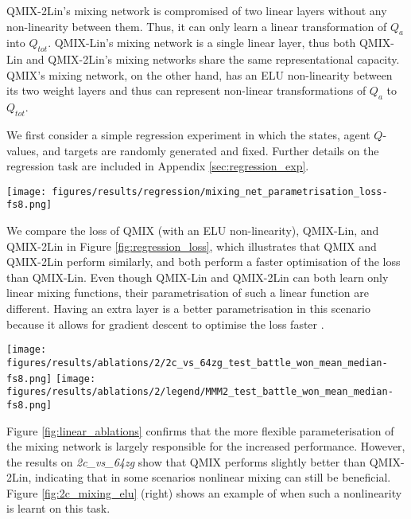 \documentclass[twoside,11pt]{article}
\begin{document}
QMIX-2Lin's mixing network is compromised of two linear layers without any non-linearity between them. Thus, it can only learn a linear transformation of $Q_a$ into $Q_{tot}$. 
QMIX-Lin's mixing network is a single linear layer, thus both QMIX-Lin and QMIX-2Lin's mixing networks share the same representational capacity.
QMIX's mixing network, on the other hand, has an ELU non-linearity between its 
two weight layers and thus can represent non-linear transformations of $Q_a$ to 
$Q_{tot}$. 

We first consider a simple regression experiment in which the states, agent $Q$-values, and targets are randomly generated and fixed. 
Further details on the regression task are included in Appendix \ref{sec:regression_exp}.

\begin{figure*}[h!]
    \centering
    \texttt{[image: figures/results/regression/mixing\_net\_parametrisation\_loss-fs8.png]}
    \caption{The loss on a regression task.}
    \label{fig:regression_loss}
\end{figure*}

We compare the loss of QMIX (with an ELU non-linearity), QMIX-Lin, and QMIX-2Lin in Figure \ref{fig:regression_loss}, which illustrates that QMIX and QMIX-2Lin perform similarly, and both perform a faster optimisation of the loss than QMIX-Lin.
Even though QMIX-Lin and QMIX-2Lin can both learn only linear mixing functions, their parametrisation of such a linear function are different.
Having an extra layer is a better parametrisation in this scenario because it allows for gradient descent to optimise the loss faster \citep{arora2018convergence}.

\begin{figure*}[h!]
    \centering
    \texttt{[image: figures/results/ablations/2/2c\_vs\_64zg\_test\_battle\_won\_mean\_median-fs8.png]}
    \texttt{[image: figures/results/ablations/2/legend/MMM2\_test\_battle\_won\_mean\_median-fs8.png]}
    \caption{Ablations for linear experiments.}
    \label{fig:linear_ablations}
\end{figure*}

Figure \ref{fig:linear_ablations} confirms that the more flexible 
parameterisation of the mixing network is largely responsible for the increased 
performance. 
However, the results on \textit{2c\_vs\_64zg} show that QMIX performs slightly 
better than QMIX-2Lin, indicating that in some scenarios nonlinear mixing can 
still be beneficial. 
Figure \ref{fig:2c_mixing_elu} (right) shows an example of when such a nonlinearity is learnt on this task.
\end{document}
